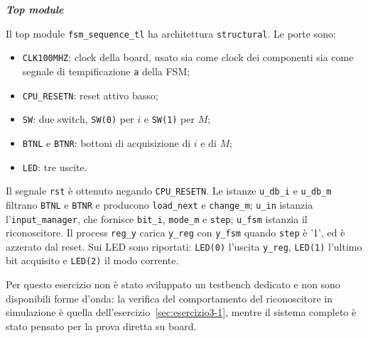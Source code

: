 



\medskip\noindent\textbf{\textit{Top module}}

Il top module \texttt{fsm\_sequence\_tl} ha architettura \texttt{structural}. Le porte sono:

\begin{itemize}
  \item \texttt{CLK100MHZ}: clock della board, usato sia come clock dei componenti sia come segnale di tempificazione \texttt{a} della FSM;
  \item \texttt{CPU\_RESETN}: reset attivo basso;
  \item \texttt{SW}: due switch, \texttt{SW(0)} per $i$ e \texttt{SW(1)} per $M$;
  \item \texttt{BTNL} e \texttt{BTNR}: bottoni di acquisizione di $i$ e di $M$;
  \item \texttt{LED}: tre uscite.
\end{itemize}

Il segnale \texttt{rst} è ottenuto negando \texttt{CPU\_RESETN}. Le istanze \texttt{u\_db\_i} e \texttt{u\_db\_m} filtrano \texttt{BTNL} e \texttt{BTNR} e producono \texttt{load\_next} e \texttt{change\_m}; \texttt{u\_in} istanzia l'\texttt{input\_manager}, che fornisce \texttt{bit\_i}, \texttt{mode\_m} e \texttt{step}; \texttt{u\_fsm} istanzia il riconoscitore. Il process \texttt{reg\_y} carica \texttt{y\_reg} con \texttt{y\_fsm} quando \texttt{step} è '1', ed è azzerato dal reset. Sui LED sono riportati: \texttt{LED(0)} l'uscita \texttt{y\_reg}, \texttt{LED(1)} l'ultimo bit acquisito e \texttt{LED(2)} il modo corrente.


\simulazione

Per questo esercizio non è stato sviluppato un testbench dedicato e non sono disponibili forme d'onda: la verifica del comportamento del riconoscitore in simulazione è quella dell'esercizio~\ref{sec:esercizio3-1}, mentre il sistema completo è stato pensato per la prova diretta su board.

